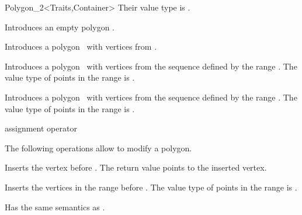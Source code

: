 \begin{ccClassTemplate}{Polygon_2<Traits,Container>}
Their value type is .

\ccCreation
{}
\ccThreeToTwo

  \ccHidden{}
    { Introduces an empty polygon \ccVar.}

  \ccHidden{}
    { Introduces a polygon \ccVar\ with vertices from .}

    { Introduces a polygon \ccVar\ with vertices from the sequence defined by
      the range \ccStyle{[first,last)}.
      \ccPrecond The value type of points in the range \ccStyle{[first,last)} is
                 .
    }

    { Introduces a polygon \ccVar\ with vertices from the sequence defined by
      the range .
      \ccPrecond The value type of points in the range \ccStyle{[first,last)} is
                 .
    }


  \ccHidden{}
   {assignment operator}

\newpage
{}

The following operations allow to modify a polygon.

    { Inserts the vertex  before .
      The return value points to the inserted vertex. }

    { Inserts the vertices in the range \ccStyle{[first, last)} before
      .
      \ccPrecond The value type of points in the range \ccStyle{[first,last)} is
                 .
    }

    { Has the same semantics as .}


\end{ccClassTemplate}
